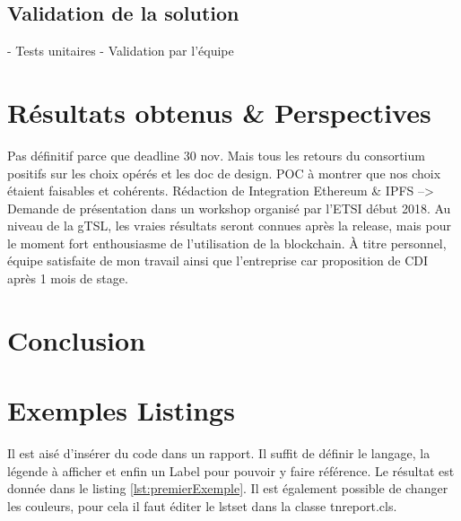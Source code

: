 \documentclass{tnreport}
\begin{document}
\section{Validation de la solution}

- Tests unitaires
- Validation par l'équipe

\chapter{Résultats obtenus \& Perspectives}

Pas définitif parce que deadline 30 nov.
Mais tous les retours du consortium positifs sur les choix opérés et les doc de design.
POC à montrer que nos choix étaient faisables et cohérents.
Rédaction de Integration Ethereum \& IPFS --> Demande de présentation dans un workshop organisé par l'ETSI début 2018.
Au niveau de la gTSL, les vraies résultats seront connues après la release, mais pour le moment fort enthousiasme de l'utilisation de la blockchain.
À titre personnel, équipe satisfaite de mon travail ainsi que l'entreprise car proposition de CDI après 1 mois de stage.

\chapter{Conclusion}

\cleardoublepage

\chapter{Exemples Listings}

Il est aisé d'insérer du code dans un rapport. Il suffit de définir le langage, la légende à afficher et enfin un Label pour pouvoir y faire référence. Le résultat est donnée dans le listing \ref{lst:premierExemple}. Il est également possible de changer les couleurs, pour cela il faut éditer le lstset dans la classe tnreport.cls.
\end{document}
